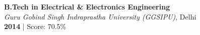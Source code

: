 %
%


\textbf{B.Tech in Electrical \& Electronics Engineering}\\
\emph{Guru Gobind Singh Indraprastha University (GGSIPU)}, Delhi\\
\textbf{2014} | Score: 70.5\%
